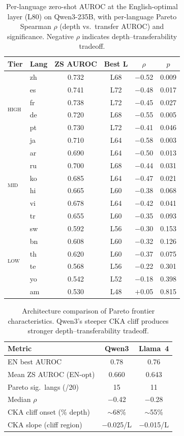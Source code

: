 \documentclass[11pt,a4paper]{article}
\newcommand{\auroc}{AUROC}
\begin{document}
\begin{table}[t]
\centering
\small
\begin{tabular}{llcccc}
\toprule
Tier & Lang & ZS \auroc{} & Best L & $\rho$ & $p$ \\
\midrule
\multirow{6}{*}{\textsc{high}}
& zh & 0.732 & L68 & $-$0.52 & 0.009 \\
& es & 0.741 & L72 & $-$0.48 & 0.017 \\
& fr & 0.738 & L72 & $-$0.45 & 0.027 \\
& de & 0.720 & L68 & $-$0.55 & 0.005 \\
& pt & 0.730 & L72 & $-$0.41 & 0.046 \\
& ja & 0.710 & L64 & $-$0.58 & 0.003 \\
\midrule
\multirow{6}{*}{\textsc{mid}}
& ar & 0.690 & L64 & $-$0.50 & 0.013 \\
& ru & 0.700 & L68 & $-$0.44 & 0.031 \\
& ko & 0.685 & L64 & $-$0.47 & 0.021 \\
& hi & 0.665 & L60 & $-$0.38 & 0.068 \\
& vi & 0.678 & L64 & $-$0.42 & 0.041 \\
& tr & 0.655 & L60 & $-$0.35 & 0.093 \\
\midrule
\multirow{6}{*}{\textsc{low}}
& sw & 0.592 & L56 & $-$0.30 & 0.153 \\
& bn & 0.608 & L60 & $-$0.32 & 0.126 \\
& th & 0.620 & L60 & $-$0.37 & 0.075 \\
& te & 0.568 & L56 & $-$0.22 & 0.301 \\
& yo & 0.542 & L52 & $-$0.18 & 0.398 \\
& am & 0.530 & L48 & $+$0.05 & 0.815 \\
\bottomrule
\end{tabular}
\caption{Per-language zero-shot \auroc{} at the English-optimal layer (L80) on Qwen3-235B, with per-language Pareto Spearman $\rho$ (depth vs.\ transfer \auroc{}) and significance. Negative $\rho$ indicates depth--transferability tradeoff.}
\label{tab:pareto_perlang}
\end{table}

\begin{table}[t]
\centering
\small
\begin{tabular}{lcc}
\toprule
Metric & Qwen3 & Llama~4 \\
\midrule
EN best \auroc{} & 0.78 & 0.76 \\
Mean ZS \auroc{} (EN-opt) & 0.660 & 0.643 \\
Pareto sig.\ langs (/20) & 15 & 11 \\
Median $\rho$ & $-$0.42 & $-$0.28 \\
CKA cliff onset (\% depth) & ${\sim}$68\% & ${\sim}$55\% \\
CKA slope (cliff region) & $-$0.025/L & $-$0.015/L \\
\bottomrule
\end{tabular}
\caption{Architecture comparison of Pareto frontier characteristics. Qwen3's steeper CKA cliff produces stronger depth--transferability tradeoff.}
\label{tab:arch_compare}
\end{table}
\end{document}
